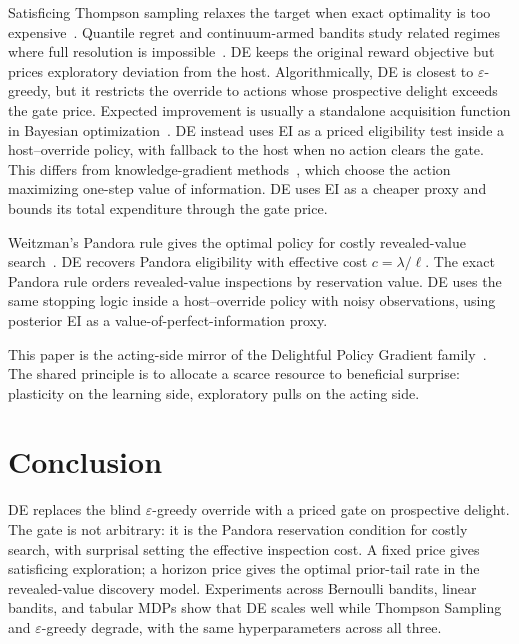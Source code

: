 \documentclass{article}
\newcommand{\surp}{\ell} %
\begin{document}
Satisficing Thompson sampling relaxes the target when exact optimality is too expensive~\citep{russo2022satisficing}.
Quantile regret and continuum-armed bandits study related regimes where full resolution is impossible~\citep{lattimore2024quantile,bubeck2011xarmed}.
DE keeps the original reward objective but prices exploratory deviation from the host.
Algorithmically, DE is closest to $\varepsilon$-greedy, but it restricts the override to actions whose prospective delight exceeds the gate price.
Expected improvement is usually a standalone acquisition function in Bayesian optimization~\citep{mockus1978application,jones1998efficient}.
DE instead uses EI as a priced eligibility test inside a host--override policy, with fallback to the host when no action clears the gate.
This differs from knowledge-gradient methods~\citep{frazier2008knowledge}, which choose the action maximizing one-step value of information.
DE uses EI as a cheaper proxy and bounds its total expenditure through the gate price.

Weitzman's Pandora rule gives the optimal policy for costly revealed-value search~\citep{weitzman1979optimal}.
DE recovers Pandora eligibility with effective cost $c=\lambda/\surp$.
The exact Pandora rule orders revealed-value inspections by reservation value.
DE uses the same stopping logic inside a host--override policy with noisy observations, using posterior EI as a value-of-perfect-information proxy.

This paper is the acting-side mirror of the Delightful Policy Gradient family~\citep{osband2026delightfulpolicygradient,osband2026doesgradientsparkjoy,osband2026delightfuldistributedpolicygradient}.
The shared principle is to allocate a scarce resource to beneficial surprise: plasticity on the learning side, exploratory pulls on the acting side.


\section{Conclusion}
\label{sec:conclusion}

DE replaces the blind $\varepsilon$-greedy override with a priced gate on prospective delight.
The gate is not arbitrary: it is the Pandora reservation condition for costly search, with surprisal setting the effective inspection cost.
A fixed price gives satisficing exploration; a horizon price gives the optimal prior-tail rate in the revealed-value discovery model.
Experiments across Bernoulli bandits, linear bandits, and tabular MDPs show that DE scales well while Thompson Sampling and $\varepsilon$-greedy degrade, with the same hyperparameters across all three.
\end{document}
